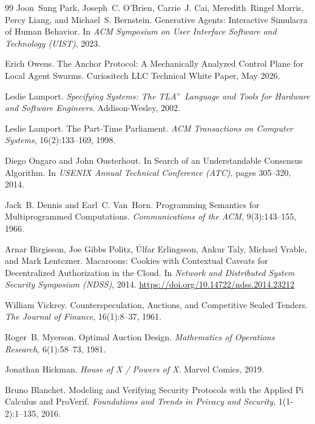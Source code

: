 \documentclass[11pt,a4paper]{article}
\theoremstyle{definition}
\theoremstyle{remark}
\begin{document}
\begin{thebibliography}{99}
Joon~Sung Park, Joseph~C. O'Brien, Carrie~J. Cai, Meredith~Ringel Morris, Percy Liang, and Michael~S. Bernstein.
\newblock Generative Agents: Interactive Simulacra of Human Behavior.
\newblock In \textit{ACM Symposium on User Interface Software and Technology (UIST)}, 2023.

Erich Owens.
\newblock The Anchor Protocol: A Mechanically Analyzed Control Plane for Local Agent Swarms.
\newblock Curiositech LLC Technical White Paper, May 2026.

Leslie Lamport.
\newblock \textit{Specifying Systems: The TLA$^{+}$ Language and Tools for Hardware and Software Engineers}.
\newblock Addison-Wesley, 2002.

Leslie Lamport.
\newblock The Part-Time Parliament.
\newblock \textit{ACM Transactions on Computer Systems}, 16(2):133--169, 1998.

Diego Ongaro and John Ousterhout.
\newblock In Search of an Understandable Consensus Algorithm.
\newblock In \textit{USENIX Annual Technical Conference (ATC)}, pages 305--320, 2014.

Jack~B. Dennis and Earl~C. Van~Horn.
\newblock Programming Semantics for Multiprogrammed Computations.
\newblock \textit{Communications of the ACM}, 9(3):143--155, 1966.

Arnar Birgisson, Joe Gibbs Politz, Úlfar Erlingsson, Ankur Taly, Michael Vrable, and Mark Lentczner.
\newblock Macaroons: Cookies with Contextual Caveats for Decentralized Authorization in the Cloud.
\newblock In \textit{Network and Distributed System Security Symposium (NDSS)}, 2014.
\newblock \url{https://doi.org/10.14722/ndss.2014.23212}

William Vickrey.
\newblock Counterspeculation, Auctions, and Competitive Sealed Tenders.
\newblock \textit{The Journal of Finance}, 16(1):8--37, 1961.

Roger~B. Myerson.
\newblock Optimal Auction Design.
\newblock \textit{Mathematics of Operations Research}, 6(1):58--73, 1981.

Jonathan Hickman.
\newblock \textit{House of X / Powers of X}.
\newblock Marvel Comics, 2019.

Bruno Blanchet.
\newblock Modeling and Verifying Security Protocols with the Applied Pi Calculus and ProVerif.
\newblock \textit{Foundations and Trends in Privacy and Security}, 1(1-2):1--135, 2016.


\end{thebibliography}
\end{document}
